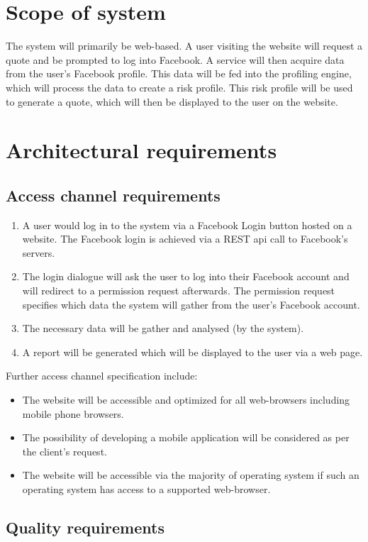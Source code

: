 \documentclass{article}
\begin{document}
\section{Scope of system}
The system will primarily be web-based. A user visiting the website will request a quote and be prompted to log into Facebook. A service will then acquire data from the user’s Facebook profile. This data will be fed into the profiling engine, which will process the data to create a risk profile. This risk profile will be used to generate a quote, which will then be displayed to the user on the website.

\section{Architectural requirements}
	\subsection{Access channel requirements}
	\begin{enumerate}
		\item A user would log in to the system via a Facebook Login button hosted on a website. The Facebook login is achieved via a REST api call to Facebook's servers.
		\item The login dialogue will ask the user to log into their Facebook account and will redirect to a permission request afterwards. The permission request specifies which data the system will gather from the user's Facebook account.
		\item The necessary data will be gather and analysed (by the system).
		\item A report will be generated which will be displayed to the user via a web page.
	\end{enumerate}
	Further access channel specification include:
	\begin{itemize}
		\item The website will be accessible and optimized for all web-browsers including mobile phone browsers.
		\item The possibility of developing a mobile application will be considered as per the client's request.
		\item The website will be accessible via the majority of operating system if such an operating system has access to a supported web-browser.
	\end{itemize}
	 
	
	
	
	\subsection{Quality requirements}
\end{document}
